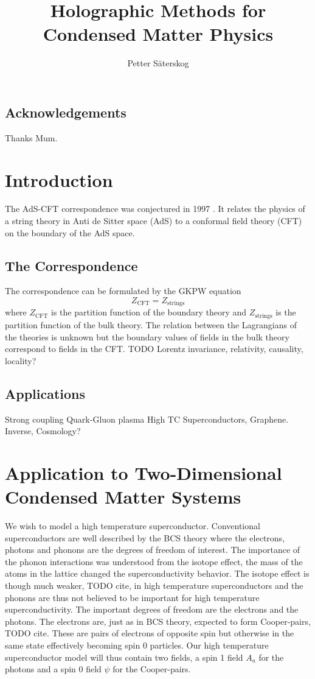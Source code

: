 \documentclass[12pt]{report}
\title{Holographic Methods for Condensed Matter Physics}
\author{Petter Säterskog}
\begin{document}
\titlepic{
\centering

}
\maketitle
\section*{Acknowledgements}
Thanks Mum.
\tableofcontents
\chapter{Introduction}
The AdS-CFT correspondence was conjectured in 1997 \cite{Maldacena:1997re}. It relates the physics of a string theory in Anti de Sitter space (AdS) to a conformal field theory (CFT) on the boundary of the AdS space.

\section{The Correspondence\label{correspondence}}
The correspondence can be formulated by the GKPW equation \cite{Witten:1998qj}
\begin{equation}
 Z_{\text{CFT}}=Z_{\text{strings}}
\label{GKPW}
\end{equation}
where $Z_{\text{CFT}}$ is the partition function of the boundary theory and $Z_{\text{strings}}$ is the partition function of the bulk theory. The relation between the Lagrangians of the theories is unknown but the boundary values of fields in the bulk theory correspond to fields in the CFT.
TODO
Lorentz invariance, relativity, causality, locality?
\section{Applications}
Strong coupling
Quark-Gluon plasma
High TC Superconductors, Graphene.
Inverse, Cosmology?

\chapter{Application to Two-Dimensional Condensed Matter Systems}
We wish to model a high temperature superconductor. Conventional superconductors are well described by the BCS theory where the electrons, photons and phonons are the degrees of freedom of interest. The importance of the phonon interactions was understood from the isotope effect, the mass of the atoms in the lattice changed the superconductivity behavior. The isotope effect is though much weaker, TODO cite, in high temperature superconductors and the phonons are thus not believed to be important for high temperature superconductivity. The important degrees of freedom are the electrons and the photons. The electrons are, just as in BCS theory, expected to form Cooper-pairs, TODO cite. These are pairs of electrons of opposite spin but otherwise in the same state effectively becoming spin 0 particles. Our high temperature superconductor model will thus contain two fields, a spin 1 field $A_a$ for the photons and a spin 0 field $\psi$ for the Cooper-pairs.
\end{document}
